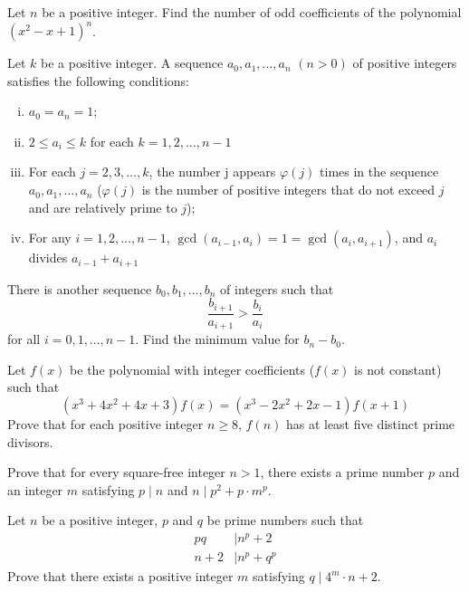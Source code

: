 \documentclass[problems.tex]{subfile}
\begin{document}
	\begin{problem}
		Let $n$ be a positive integer. Find the number of odd coefficients of the polynomial $(x^2-x+1)^n$. %
	\end{problem}

	\begin{problem}
		Let $k$ be a positive integer. A sequence $a_0, a_1, \dots, a_n$ $(n>0)$ of positive integers satisfies the following conditions:
		\begin{enumerate}[(i)]
			\item $a_0=a_n=1$;
			\item $2\leq a_i\leq k$ for each $k=1,2,\dots,n-1$
			\item For each $j=2,3,\dots,k$, the number j appears $\varphi (j)$ times in the sequence $a_0,a_1,\dots,a_n$ ($\varphi (j)$ is the number of positive integers that do not exceed $j$ and are relatively prime to $j$);
			\item For any $i=1,2,\dots,n-1$, $\gcd(a_{i-1},a_i)=1=\gcd(a_i,a_{i+1})$, and $a_i$ divides $a_{i-1}+a_{i+1}$
		\end{enumerate}
		There is another sequence $b_0,b_1,\dots,b_n$ of integers such that $$\frac{b_{i+1}}{a_{i+1}}>\frac{b_i}{a_i}$$ for all $i=0,1,\dots,n-1$. Find the minimum value for $b_n-b_0$. %
	\end{problem}

	\begin{problem}
		Let $f(x)$ be the polynomial with integer coefficients ($f(x)$ is not constant) such that
		\[(x^3+4x^2+4x+3)f(x)=(x^3-2x^2+2x-1)f(x+1)\]Prove that for each positive integer $n\geq8$, $f(n)$ has at least five distinct prime divisors. %
	\end{problem}

	\begin{problem}
		Prove that for every square-free integer $n>1$, there exists a prime number $p$ and an integer $m$ satisfying $p \mid n$ and $n \mid p^2+p\cdot m^p$.
	\end{problem}

	\begin{problem}
		Let $n$ be a positive integer, $p$ and $q$ be prime numbers such that
			\begin{align*}
				pq
					& \mid n^p+2\\
				n+2
					& \mid n^p+q^p
			\end{align*}
		Prove that there exists a positive integer $m$ satisfying $q \mid 4^m \cdot n +2$. %
	\end{problem}
\end{document}
